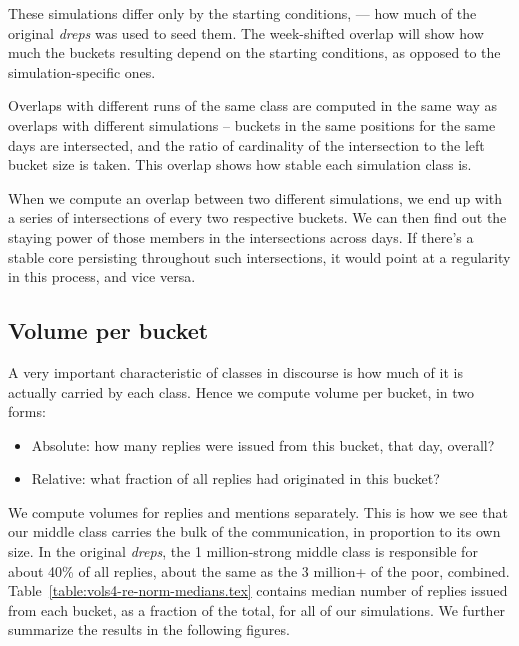 \documentclass[10pt,oneside]{memoir}
\begin{document}
These simulations differ only by the starting conditions, --- how much of the original {\itshape dreps} was used to seed them.  The week-shifted overlap will show how much the buckets resulting depend on the starting conditions, as opposed to the simulation-specific ones.


\label{sec:overx-xreps}
Overlaps with different runs of the same class are computed in the same way as overlaps with different simulations -- buckets in the same positions for the same days are intersected, and the ratio of cardinality of the intersection to the left bucket size is taken.  This overlap shows how stable each simulation class is.


When we compute an overlap between two different simulations, we end up with a series of intersections of every two respective buckets.  We can then find out the staying power of those members in the intersections across days.  If there's a stable core persisting throughout such intersections, it would point at a regularity in this process, and vice versa.


\pagebreak \subsection{Volume per bucket}
\label{volumeperbucket}

A very important characteristic of classes in discourse is how much of it is actually carried by each class.  Hence we compute volume per bucket, in two forms:


\begin{itemize}


\item Absolute: how many replies were issued from this bucket, that day, overall?

\item Relative: what fraction of all replies had originated in this bucket?
\end{itemize}

We compute volumes for replies and mentions separately.  This is how we see that our middle class carries the bulk of the communication, in proportion to its own size.  In the original {\itshape dreps}, the 1 million-strong middle class is responsible for about 40\% of all replies, about the same as the 3 million+ of the poor, combined.  Table~\ref{table:vols4-re-norm-medians.tex} contains median number of replies issued from each bucket, as a fraction of the total, for all of our simulations.  We further summarize the results in the following figures.
\end{document}
